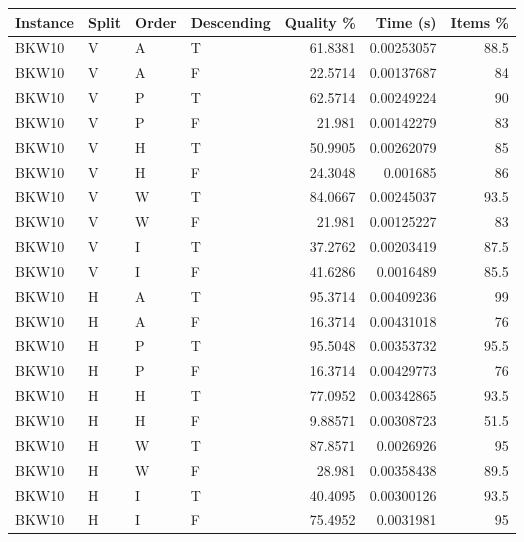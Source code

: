 \begin{tabular}{llllrrr}
    \hline
    Instance & Split & Order & Descending & Quality \% & Time (s)   & Items \% \\
    \hline
    BKW10    & V     & A     & T          & 61.8381    & 0.00253057 & 88.5     \\
    BKW10    & V     & A     & F          & 22.5714    & 0.00137687 & 84       \\
    BKW10    & V     & P     & T          & 62.5714    & 0.00249224 & 90       \\
    BKW10    & V     & P     & F          & 21.981     & 0.00142279 & 83       \\
    BKW10    & V     & H     & T          & 50.9905    & 0.00262079 & 85       \\
    BKW10    & V     & H     & F          & 24.3048    & 0.001685   & 86       \\
    BKW10    & V     & W     & T          & 84.0667    & 0.00245037 & 93.5     \\
    BKW10    & V     & W     & F          & 21.981     & 0.00125227 & 83       \\
    BKW10    & V     & I     & T          & 37.2762    & 0.00203419 & 87.5     \\
    BKW10    & V     & I     & F          & 41.6286    & 0.0016489  & 85.5     \\
    BKW10    & H     & A     & T          & 95.3714    & 0.00409236 & 99       \\
    BKW10    & H     & A     & F          & 16.3714    & 0.00431018 & 76       \\
    BKW10    & H     & P     & T          & 95.5048    & 0.00353732 & 95.5     \\
    BKW10    & H     & P     & F          & 16.3714    & 0.00429773 & 76       \\
    BKW10    & H     & H     & T          & 77.0952    & 0.00342865 & 93.5     \\
    BKW10    & H     & H     & F          & 9.88571    & 0.00308723 & 51.5     \\
    BKW10    & H     & W     & T          & 87.8571    & 0.0026926  & 95       \\
    BKW10    & H     & W     & F          & 28.981     & 0.00358438 & 89.5     \\
    BKW10    & H     & I     & T          & 40.4095    & 0.00300126 & 93.5     \\
    BKW10    & H     & I     & F          & 75.4952    & 0.0031981  & 95       \\

\end{tabular}
